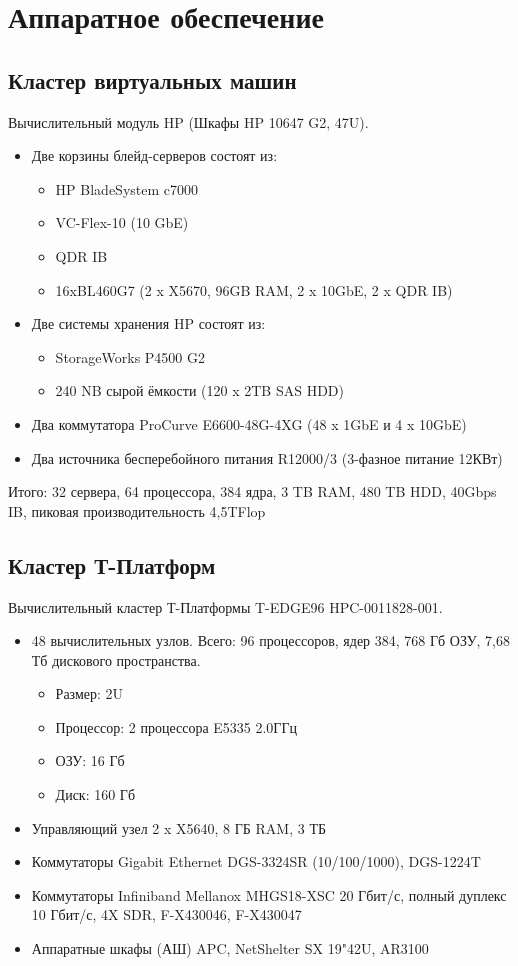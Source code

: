 \chapter{Аппаратное обеспечение}

\section{Кластер виртуальных машин}
Вычислительный модуль HP (Шкафы HP 10647 G2, 47U).
\begin{itemize}
 \item Две корзины блейд-серверов состоят из:
    \begin{itemize}
      \item HP BladeSystem c7000
      \item VC-Flex-10 (10 GbE)
      \item QDR IB
      \item 16xBL460G7 (2 x X5670, 96GB RAM, 2 x 10GbE, 2 x QDR IB)
    \end{itemize}
  \item Две системы хранения HP состоят из:
    \begin{itemize}
      \item StorageWorks P4500 G2
      \item 240 NB сырой ёмкости (120 x 2TB SAS HDD)
    \end{itemize}
  \item Два коммутатора ProCurve E6600-48G-4XG (48 x 1GbE и 4 x 10GbE)
  \item Два  источника бесперебойного питания R12000/3 (3-фазное питание 12КВт)
\end{itemize}

Итого: 32 сервера, 64 процессора, 384 ядра, 3 TB RAM, 480 TB HDD, 40Gbps IB, пиковая производительность 4,5TFlop

\section{Кластер Т-Платформ}
Вычислительный кластер Т-Платформы T-EDGE96 HPC-0011828-001.
\begin{itemize}
 \item  48 вычислительных узлов. Всего: 96 процессоров, ядер 384, 768 Гб ОЗУ, 7,68 Тб дискового пространства.
  \begin{itemize}
    \item Размер: 2U
    \item Процессор: 2 процессора E5335 2.0ГГц
    \item ОЗУ: 16 Гб
    \item Диск: 160 Гб
\end{itemize}
  \item Управляющий узел 2 x X5640, 8 ГБ RAM, 3 ТБ
  \item Коммутаторы Gigabit Ethernet DGS-3324SR (10/100/1000), DGS-1224T
  \item Коммутаторы Infiniband Mellanox MHGS18-XSC 20 Гбит/с, полный дуплекс 10 Гбит/с, 4X SDR, F-X430046, F-X430047
  \item Аппаратные шкафы (АШ) APC, NetShelter SX 19"42U, AR3100
\end{itemize}

